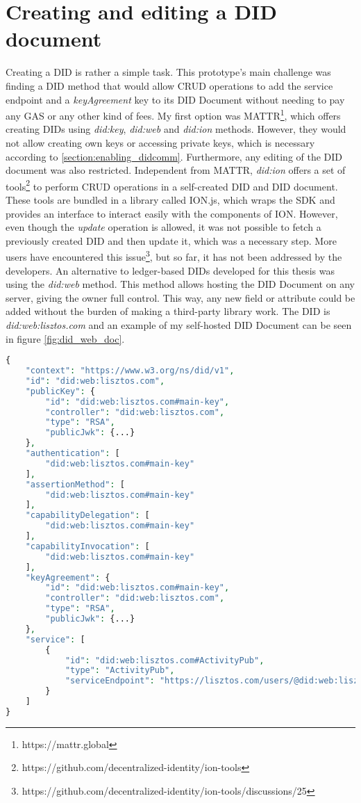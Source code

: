 \section{Creating and editing a DID document}
Creating a DID is rather a simple task. This prototype's main challenge was finding a DID method that would allow CRUD operations to add the service endpoint and a \emph{keyAgreement} key to its DID Document without needing to pay any GAS or any other kind of fees. My first option was MATTR\footnote{https://mattr.global}, which offers creating DIDs using \emph{did:key}, \emph{did:web} and \emph{did:ion} methods. However, they would not allow creating own keys or accessing private keys, which is necessary according to \autoref{section:enabling_didcomm}. Furthermore, any editing of the DID document was also restricted. Independent from MATTR, \emph{did:ion} offers a set of tools\footnote{https://github.com/decentralized-identity/ion-tools} to perform CRUD operations in a self-created DID and DID document. These tools are bundled in a library called ION.js, which wraps the SDK and provides an interface to interact easily with the components of ION. However, even though the \emph{update} operation is allowed, it was not possible to fetch a previously created DID and then update it, which was a necessary step. More users have encountered this issue\footnote{https://github.com/decentralized-identity/ion-tools/discussions/25}, but so far, it has not been addressed by the developers. An alternative to ledger-based DIDs developed for this thesis was using the \emph{did:web} method. This method allows hosting the DID Document on any server, giving the owner full control. This way, any new field or attribute could be added without the burden of making a third-party library work. The DID is \emph{did:web:lisztos.com} and an example of my self-hosted DID Document can be seen in figure \ref{fig:did_web_doc}.


\lstset{style=JSONStyle}
\begin{lstlisting}[language=PHP, caption=did:web DID Document, label=fig:did_web_doc, float=h]
  {
    "context": "https://www.w3.org/ns/did/v1",
    "id": "did:web:lisztos.com",
    "publicKey": {
        "id": "did:web:lisztos.com#main-key",
        "controller": "did:web:lisztos.com",
        "type": "RSA",
        "publicJwk": {...}
    },
    "authentication": [
        "did:web:lisztos.com#main-key"
    ],
    "assertionMethod": [
        "did:web:lisztos.com#main-key"
    ],
    "capabilityDelegation": [
        "did:web:lisztos.com#main-key"
    ],
    "capabilityInvocation": [
        "did:web:lisztos.com#main-key"
    ],
    "keyAgreement": {
        "id": "did:web:lisztos.com#main-key",
        "controller": "did:web:lisztos.com",
        "type": "RSA",
        "publicJwk": {...}
    },
    "service": [
        {
            "id": "did:web:lisztos.com#ActivityPub",
            "type": "ActivityPub",
            "serviceEndpoint": "https://lisztos.com/users/@did:web:lisztos.com"
        }
    ]
}
\end{lstlisting}


